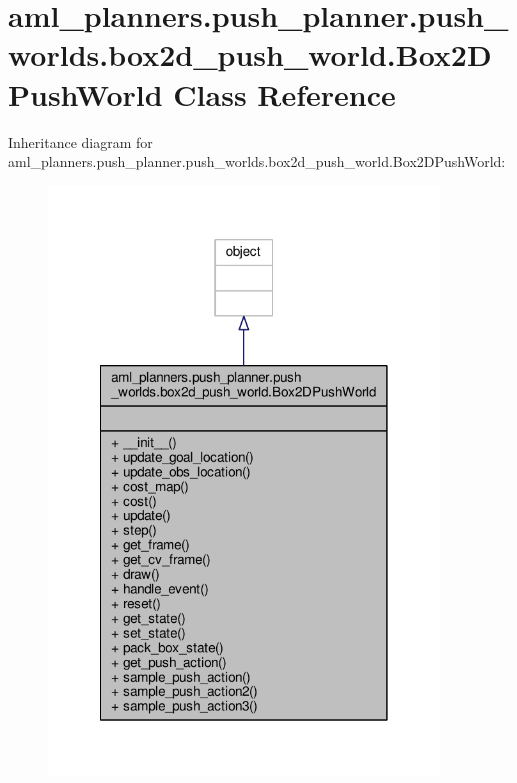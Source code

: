 \hypertarget{classaml__planners_1_1push__planner_1_1push__worlds_1_1box2d__push__world_1_1_box2_d_push_world}{\section{aml\-\_\-planners.\-push\-\_\-planner.\-push\-\_\-worlds.\-box2d\-\_\-push\-\_\-world.\-Box2\-D\-Push\-World Class Reference}
\label{classaml__planners_1_1push__planner_1_1push__worlds_1_1box2d__push__world_1_1_box2_d_push_world}
}


Inheritance diagram for aml\-\_\-planners.\-push\-\_\-planner.\-push\-\_\-worlds.\-box2d\-\_\-push\-\_\-world.\-Box2\-D\-Push\-World\-:
\nopagebreak
\begin{figure}[H]
\begin{center}
\leavevmode
\includegraphics[width=294pt]{classaml__planners_1_1push__planner_1_1push__worlds_1_1box2d__push__world_1_1_box2_d_push_world__inherit__graph}
\end{center}
\end{figure}



